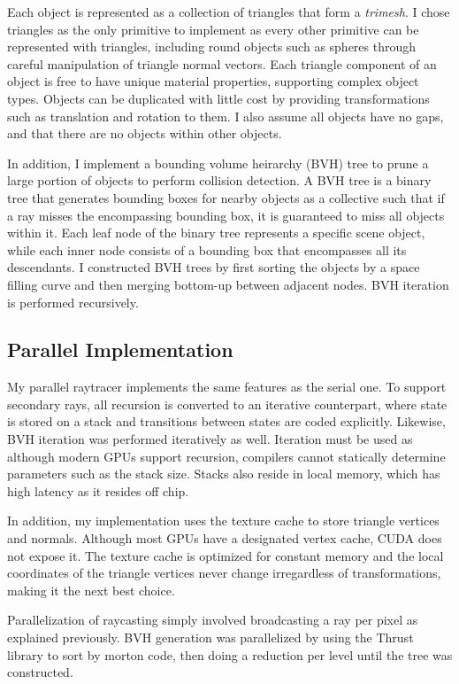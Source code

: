 \documentclass[11pt]{article}
\begin{document}
Each object is represented as a collection of triangles that form a \textit{trimesh}. I chose triangles as the only
primitive to implement as every other primitive can be represented with triangles, including round objects such
as spheres through careful manipulation of triangle normal vectors. Each triangle component of an object is free
to have unique material properties, supporting complex object types. Objects can be duplicated with little cost by 
providing transformations such as translation and rotation to them. I also assume all objects have no gaps, and that
there are no objects within other objects.

In addition, I implement a bounding volume heirarchy (BVH) tree to prune a large portion of objects to perform collision
detection. A BVH tree is a binary tree that generates bounding boxes for nearby objects as a collective such that
if a ray misses the encompassing bounding box, it is guaranteed to miss all objects within it. Each leaf node of
the binary tree represents a specific scene object, while each inner node consists of a bounding box that encompasses
all its descendants. I constructed BVH trees by first sorting the objects by a space filling curve and then 
merging bottom-up between adjacent nodes. BVH iteration is performed recursively.

\subsection{Parallel Implementation}
My parallel raytracer implements the same features as the serial one. To support secondary rays, all recursion is
converted to an iterative counterpart, where state is stored on a stack and transitions between states are coded explicitly.
Likewise, BVH iteration was performed iteratively as well. Iteration must be used as although modern GPUs support recursion,
compilers cannot statically determine parameters such as the stack size. Stacks also reside in local memory, which
has high latency as it resides off chip.

In addition, my implementation uses the texture cache to store triangle vertices and normals. Although most GPUs have a designated
vertex cache, CUDA does not expose it. The texture cache is optimized for constant memory and the local coordinates of the triangle 
vertices never change irregardless of transformations, making it the next best choice.

Parallelization of raycasting simply involved broadcasting a ray per pixel as explained previously. BVH generation was parallelized
by using the Thrust library to sort by morton code, then doing a reduction per level until the tree was constructed.
\end{document}
